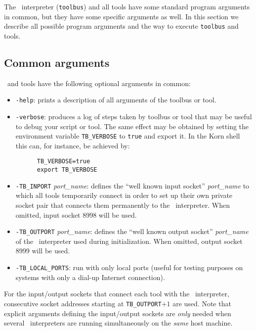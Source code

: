The \TB\ interpreter ({\tt toolbus}) and all tools have some
standard program arguments in common, but they have some specific
arguments as well. In this section we describe all possible program arguments
and the way to execute {\tt toolbus} and tools.

\subsection{Common arguments}

\TB\ and tools have the following optional arguments in common:
\begin{itemize}

\item {\tt -help}: prints a description of all arguments of the toolbus or tool.

\item {\tt -verbose}: produces a log of steps taken by toolbus or tool
that may be useful to debug your script or tool. The same effect may be obtained
by setting the environment variable {\tt TB\_VERBOSE}
to {\tt true} and export it.
In the Korn shell this can, for instance, be achieved by:
\begin{verbatim}
      TB_VERBOSE=true
      export TB_VERBOSE
\end{verbatim}

\item {\tt -TB\_INPORT} {\em port\_name}: defines the ``well known input socket'' {\em port\_name}
to which all tools temporarily connect in order to set up their
own private socket pair that connects them permanently to the \TB\ interpreter.
When omitted, input socket 8998 will be used.
\item {\tt -TB\_OUTPORT} {\em port\_name}:  defines the ``well known output socket'' {\em port\_name}
of the \TB\ interpreter used during initialization.
When omitted, output socket 8999 will be used.
\item {\tt -TB\_LOCAL\_PORTS}: run with only local ports (useful for testing
purposes on systems with only a dial-up Internet connection).

\end{itemize}

For the input/output sockets that connect each tool with the \TB\ interpreter,
consecutive socket addresses starting at {\tt TB\_OUTPORT}$+1$ are used.
Note that explicit arguments defining the input/output sockets are {\em only}
needed when several \TB\ interpreters are running simultaneously on
the {\em same} host machine.

